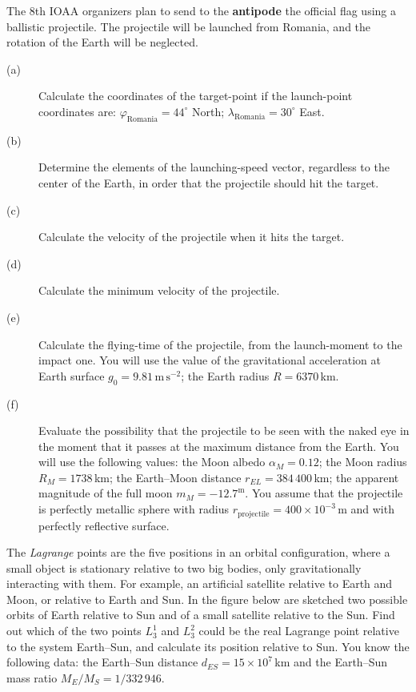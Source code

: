 The 8th IOAA organizers plan to send to the \textbf{antipode} the official
flag using a ballistic projectile. The projectile will be launched from
Romania, and the rotation of the Earth will be neglected.

\begin{description}
\item[(a)] Calculate the coordinates of the target-point if the launch-point
  coordinates are: $\varphi_{\mathrm{Romania}} = 44^\circ$ North;
  $\lambda_{\mathrm{Romania}} = 30^\circ$ East.
\item[(b)] Determine the elements of the launching-speed vector, regardless to
  the center of the Earth, in order that the projectile should hit the target.
\item[(c)] Calculate the velocity of the projectile when it hits the target.
\item[(d)] Calculate the minimum velocity of the projectile.
\item[(e)] Calculate the flying-time of the projectile, from the launch-moment
  to the impact one. You will use the value of the gravitational acceleration
  at Earth surface $g_0 = 9.81$\,$\mathrm{m\,s^{-2}}$; the Earth radius
  $R = 6370$\,km.
\item[(f)] Evaluate the possibility that the projectile to be seen with the
  naked eye in the moment that it passes at the maximum distance from the
  Earth. You will use the following values: the Moon albedo
  $\alpha_M = 0.12$; the Moon radius $R_M = 1738$\,km; the Earth--Moon
  distance $r_{EL} = 384\,400$\,km; the apparent magnitude of the full moon
  $m_M = -12.7^{\mathrm{m}}$. You assume that the projectile is perfectly
  metallic sphere with radius
  $r_{\mathrm{projectile}} = 400 \times 10^{-3}$\,m and with perfectly
  reflective surface.
\end{description}

The \textit{Lagrange} points are the five positions in an orbital
configuration, where a small object is stationary relative to two big bodies,
only gravitationally interacting with them. For example, an artificial
satellite relative to Earth and Moon, or relative to Earth and Sun. In the
figure below are sketched two possible orbits of Earth relative to Sun and of
a small satellite relative to the Sun. Find out which of the two points
$L_3^1$ and $L_3^2$ could be the real Lagrange point relative to the system
Earth--Sun, and calculate its position relative to Sun. You know the following
data: the Earth--Sun distance $d_{ES} = 15 \times 10^{7}$\,km and the
Earth--Sun mass ratio $M_E/M_S = 1/332\,946$.


